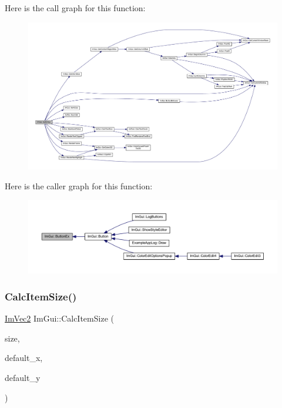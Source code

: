 Here is the call graph for this function\+:
\nopagebreak
\begin{figure}[H]
\begin{center}
\leavevmode
\includegraphics[width=350pt]{namespace_im_gui_ae479220c66b039874c6e4c9e9b22849f_cgraph}
\end{center}
\end{figure}
Here is the caller graph for this function\+:
\nopagebreak
\begin{figure}[H]
\begin{center}
\leavevmode
\includegraphics[width=350pt]{namespace_im_gui_ae479220c66b039874c6e4c9e9b22849f_icgraph}
\end{center}
\end{figure}
\mbox{\label{namespace_im_gui_a3c1505e785f9571ed82500692a727c5f}} 
\subsubsection{\texorpdfstring{Calc\+Item\+Size()}{CalcItemSize()}}
{\footnotesize\ttfamily \mbox{\hyperlink{struct_im_vec2}{Im\+Vec2}} Im\+Gui\+::\+Calc\+Item\+Size (\begin{DoxyParamCaption}\item[{\mbox{\hyperlink{struct_im_vec2}{Im\+Vec2}}}]{size,  }\item[{float}]{default\+\_\+x,  }\item[{float}]{default\+\_\+y }\end{DoxyParamCaption})}

